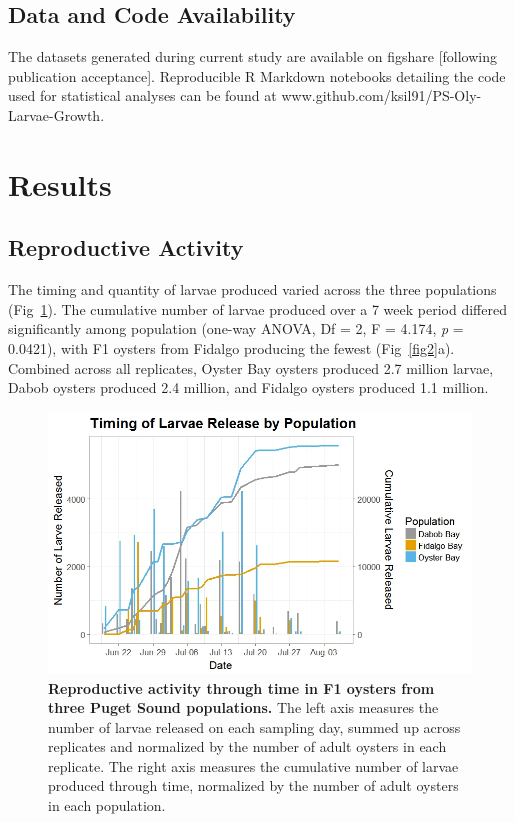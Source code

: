 \documentclass[10pt,letterpaper]{article}
\begin{document}
\subsection*{Data and Code Availability}
The datasets generated during current study are available on figshare [following publication acceptance]. Reproducible R Markdown notebooks detailing the code used for statistical analyses can be found at www.github.com/ksil91/PS-Oly-Larvae-Growth.

\section*{Results}
\subsection*{Reproductive Activity}
The timing and quantity of larvae produced varied across the three populations (Fig~\ref{fig1}). The cumulative number of larvae produced over a 7 week period differed significantly among population (one-way ANOVA, Df = 2, F = 4.174, \textit{p} = 0.0421), with F1 oysters from Fidalgo producing the fewest (Fig~\ref{fig2}a). Combined across all replicates, Oyster Bay oysters produced 2.7 million larvae, Dabob oysters produced 2.4 million, and Fidalgo oysters produced 1.1 million.

\begin{figure}[!h]
\includegraphics[width=0.7\linewidth]{overlay_larvae_timing_PS2015_color_percap.jpeg}
\caption{{\bf Reproductive activity through time in F1 oysters from three Puget Sound populations.}
The left axis measures the number of larvae released on each sampling day, summed up across replicates and normalized by the number of adult oysters in each replicate. The right axis measures the cumulative number of larvae produced through time, normalized by the number of adult oysters in each population.}
\label{fig1}
\end{figure}
\end{document}
